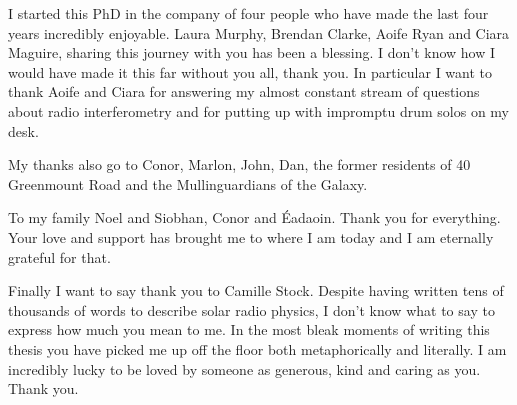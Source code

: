 \begin{acknowledgements}
I started this PhD in the company of four people who have made the last four years incredibly enjoyable. Laura Murphy, Brendan Clarke, Aoife Ryan and Ciara Maguire, sharing this journey with you has been a blessing. I don't know how I would have made it this far without you all, thank you.
In particular I want to thank Aoife and Ciara for answering my almost constant stream of questions about radio interferometry and for putting up with impromptu drum solos on my desk.

My thanks also go to Conor, Marlon, John, Dan, the former residents of 40 Greenmount Road and the Mullinguardians of the Galaxy.

To my family Noel and Siobhan, Conor and \'Eadaoin. Thank you for everything. Your love and support has brought me to where I am today and I am eternally grateful for that.

Finally I want to say thank you to Camille Stock. Despite having written tens of thousands of words to describe solar radio physics, I don't know what to say to express how much you mean to me. In the most bleak moments of writing this thesis you have picked me up off the floor both metaphorically and literally. I am incredibly lucky to be loved by someone as generous, kind and caring as you. Thank you.

\end{acknowledgements}

